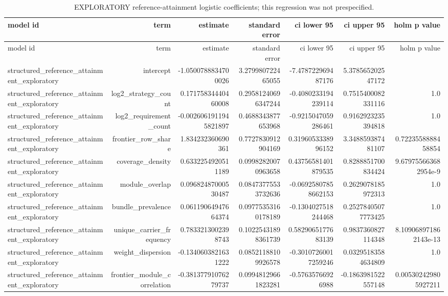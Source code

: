 {\footnotesize
\begin{longtable}{lrrrrrr}
\caption{EXPLORATORY reference-attainment logistic coefficients; this regression was not prespecified.}\label{tab:aor-exploratory-attainment-coefficients}\\
\toprule
model id & term & estimate & standard error & ci lower 95 & ci upper 95 & holm p value \\
\midrule
\endfirsthead
\toprule
model id & term & estimate & standard error & ci lower 95 & ci upper 95 & holm p value \\
\midrule
\endhead
structured\_reference\_attainment\_exploratory & intercept & -1.0500788834700026 & 3.279980722465055 & -7.478722969487176 & 5.378565202547172 &  \\
structured\_reference\_attainment\_exploratory & log2\_strategy\_count & 0.17175834440460008 & 0.29581240696347244 & -0.4080233194239114 & 0.7515400082331116 & 1.0 \\
structured\_reference\_attainment\_exploratory & log2\_requirement\_count & -0.0026061911945821897 & 0.4688343877653968 & -0.9215047059286461 & 0.9162923235394818 & 1.0 \\
structured\_reference\_attainment\_exploratory & frontier\_row\_share & 1.834232360690361 & 0.7727830912904169 & 0.3196053338996152 & 3.348859387481107 & 0.7223558888458854 \\
structured\_reference\_attainment\_exploratory & coverage\_density & 0.6332254920511189 & 0.09982820070963658 & 0.43756581401879535 & 0.8288851700834424 & 9.679755663682954e-9 \\
structured\_reference\_attainment\_exploratory & module\_overlap & 0.09682487000530487 & 0.08473775533732636 & -0.06925807858662153 & 0.2629078185972313 & 1.0 \\
structured\_reference\_attainment\_exploratory & bundle\_prevalence & 0.06119064947664374 & 0.09775353160178189 & -0.1304027518244468 & 0.25278405077773425 & 1.0 \\
structured\_reference\_attainment\_exploratory & unique\_carrier\_frequency & 0.7833213002398743 & 0.10225431898361739 & 0.5829065177683139 & 0.9837360827114348 & 8.109068971862143e-13 \\
structured\_reference\_attainment\_exploratory & weight\_dispersion & -0.1340603821631222 & 0.08521188109926578 & -0.30107260017259246 & 0.03295183584634809 & 1.0 \\
structured\_reference\_attainment\_exploratory & frontier\_module\_correlation & -0.38137791076279737 & 0.09948129661823281 & -0.57635766926988 & -0.1863981522557148 & 0.005302429805927211 \\

\end{longtable}}
